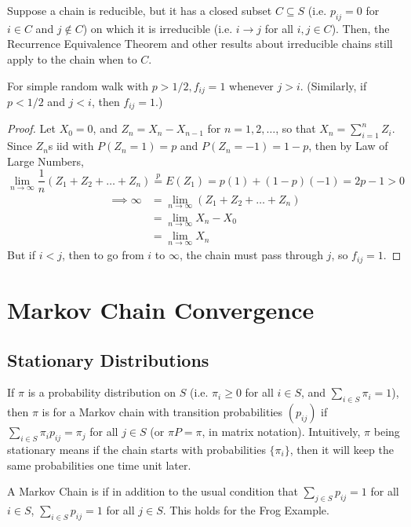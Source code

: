 \documentclass[11pt]{article}
\renewcommand{\limit}[1]{\underset{{#1} \rightarrow \infty}{\lim}}
\begin{document}
    Suppose a chain is reducible, but it has a closed subset $C \subseteq S$ (i.e. $p_{ij} = 0$ for $i \in C$ and $j \notin C$) on which it is irreducible (i.e. $i \rightarrow j$ for all $i, j \in C$). Then, the Recurrence Equivalence Theorem and other results about irreducible chains still apply to the chain when  to $C$.
    
    \proposition
    For simple random walk with $p > 1/2, f_{ij} = 1$ whenever $j > i$. (Similarly, if $p < 1/2$ and $j < i$, then $f_{ij} = 1$.)
    \begin{proof}
    	Let $X_0 = 0$, and $Z_n = X_n -X_{n-1}$ for $n = 1, 2, \hdots$, so that $X_n = \sum_{i=1}^n Z_i$. \\
    	Since $Z_n$s iid with $P(Z_n = 1) = p$ and $P(Z_n = -1) = 1- p$, then by Law of Large Numbers,
    	$$\limit{n} \frac{1}{n}(Z_1 + Z_2 + \hdots + Z_n) \overset{p}{=} E(Z_1) = p(1) + (1 - p)(-1) = 2p - 1 > 0$$
    	\begin{align*}
    		\implies \infty &= \limit{n}(Z_1 + Z_2 + \hdots + Z_n)\\
    		 &= \limit{n} X_n - X_0 \\
    		 &= \limit{n} X_n
    	\end{align*}
    	But if $i < j$, then to go from $i$ to $\infty$, the chain must pass through $j$, so $f_{ij} = 1$.
    \end{proof}
    
    \section{Markov Chain Convergence}
    \subsection{Stationary Distributions}
    If $\pi$ is a probability distribution on $S$ (i.e. $\pi_i \geq 0$ for all $i \in S$, and $\sum_{i \in S} \pi_i = 1$), then $\pi$ is  for a Markov chain with transition probabilities $(p_{ij})$ if $\sum_{i \in S} \pi_ip_{ij} = \pi_j$ for all $j \in S$ (or $\pi P = \pi$, in matrix notation).
    \remark
    Intuitively, $\pi$ being stationary means if the chain starts with probabilities $\{\pi_i\}$, then it will keep the same probabilities one time unit later.
    
    A Markov Chain is  if in addition to the usual condition that $\sum_{j \in S}p_{ij} = 1$ for all $i \in S$, $\sum_{i \in S}p_{ij} = 1$ for all $j \in S$.
    \remark
    This holds for the Frog Example.
    
\end{document}
